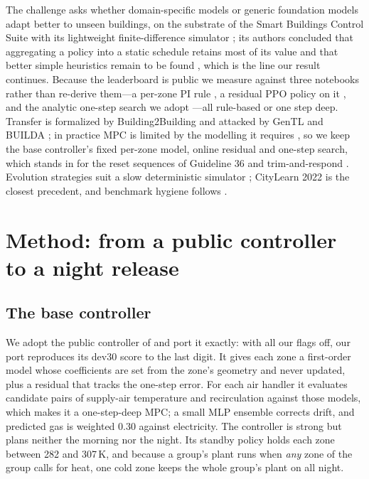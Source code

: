 \documentclass{article}
\begin{document}
The challenge \citep{goldfeder2026smart} asks whether domain-specific models or generic
foundation models adapt better to unseen buildings, on the substrate of the Smart Buildings
Control Suite \citep{goldfeder2024smart} with its lightweight finite-difference simulator
\citep{goldfeder2023lightweight}; its authors concluded that aggregating a policy into a
static schedule retains most of its value \citep{goldfeder2024policyextraction} and that
better simple heuristics remain to be found \citep{goldfeder2025iccvw}, which is the line our result continues. Because the
leaderboard is public we measure against three notebooks rather than re-derive them---a
per-zone PI rule \citep{malyshev2026ztbest}, a residual PPO policy on it
\citep{alex2026residualppo}, and the analytic one-step search we adopt
\citep{wu2026alpha075}---all rule-based or one step deep. Transfer is formalized by Building2Building
\citep{taboga2026building2building} and attacked by GenTL \citep{raisch2025gentl} and BUILDA
\citep{krug2025builda}; in practice MPC is limited by the modelling it requires
\citep{drgona2020mpc}, so we keep the base controller's fixed per-zone model, online residual and
one-step search, which stands in for the reset sequences of Guideline 36 \citep{ashrae2024g36} and
trim-and-respond \citep{taylor2015trimrespond}.
Evolution strategies suit a slow deterministic simulator
\citep{hansen2016cmaes,salimans2017es}; CityLearn 2022 \citep{nweye2023citylearn} is the closest
precedent, and benchmark hygiene follows \citep{blum2021boptest,nagy2023tenquestions}.



\section{Method: from a public controller to a night release}
\label{sec:method}

\subsection{The base controller}

We adopt the public controller of \citet{wu2026alpha075} and port it exactly: with all our
flags off, our port reproduces its dev30 score to the last digit. It gives each zone a
first-order model whose coefficients are set from the zone's geometry and never updated, plus
a residual that tracks the one-step error. For each air handler it evaluates candidate pairs of
supply-air temperature and recirculation against those models, which makes it a one-step-deep
MPC; a small MLP ensemble corrects drift, and predicted gas is weighted 0.30 against
electricity. The controller is strong but plans neither the morning nor the night. Its standby
policy holds each zone between 282 and 307\,K, and because a group's plant runs when
\emph{any} zone of the group calls for heat, one cold zone keeps the whole group's plant on all
night.
\end{document}

